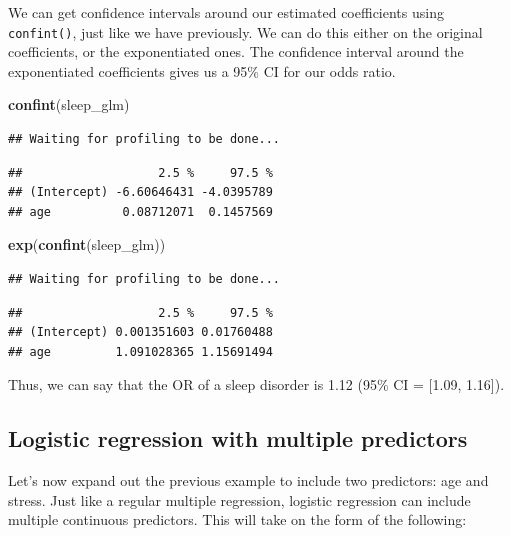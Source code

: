 \documentclass[
]{book}
\newenvironment{Shaded}{\begin{snugshade}}{\end{snugshade}}
\newcommand{\FunctionTok}[1]{\textcolor[rgb]{0.13,0.29,0.53}{\textbf{#1}}}
\newcommand{\NormalTok}[1]{#1}
\begin{document}
We can get confidence intervals around our estimated coefficients using \texttt{confint()}, just like we have previously. We can do this either on the original coefficients, or the exponentiated ones. The confidence interval around the exponentiated coefficients gives us a 95\% CI for our odds ratio.

\begin{Shaded}
\begin{Highlighting}[]
\FunctionTok{confint}\NormalTok{(sleep\_glm)}
\end{Highlighting}
\end{Shaded}

\begin{verbatim}
## Waiting for profiling to be done...
\end{verbatim}

\begin{verbatim}
##                   2.5 %     97.5 %
## (Intercept) -6.60646431 -4.0395789
## age          0.08712071  0.1457569
\end{verbatim}

\begin{Shaded}
\begin{Highlighting}[]
\FunctionTok{exp}\NormalTok{(}\FunctionTok{confint}\NormalTok{(sleep\_glm))}
\end{Highlighting}
\end{Shaded}

\begin{verbatim}
## Waiting for profiling to be done...
\end{verbatim}

\begin{verbatim}
##                   2.5 %     97.5 %
## (Intercept) 0.001351603 0.01760488
## age         1.091028365 1.15691494
\end{verbatim}

Thus, we can say that the OR of a sleep disorder is 1.12 (95\% CI = {[}1.09, 1.16{]}).

\hypertarget{logistic-regression-with-multiple-predictors}{%
\subsection{Logistic regression with multiple predictors}\label{logistic-regression-with-multiple-predictors}}

Let's now expand out the previous example to include two predictors: age and stress. Just like a regular multiple regression, logistic regression can include multiple continuous predictors. This will take on the form of the following:
\end{document}
